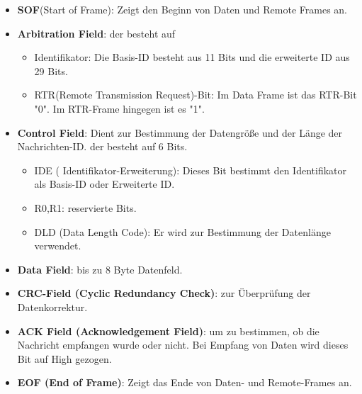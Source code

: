 \begin{itemize}
	\item \textbf{SOF}(Start of Frame):  Zeigt den Beginn von Daten und Remote Frames an.
	\item \textbf{Arbitration Field}: der besteht auf
		\begin{itemize}
			\item Identifikator: Die Basis-ID besteht aus 11 Bits und die erweiterte ID aus 29 Bits.
			\item RTR(Remote Transmission Request)-Bit: Im Data Frame ist das RTR-Bit "0". Im RTR-Frame hingegen ist es "1".
		\end{itemize}
	\item \textbf{Control Field}: Dient zur Bestimmung der Datengröße und der Länge der Nachrichten-ID. der besteht auf 6 Bits.
		\begin{itemize}
			\item IDE ( Identifikator-Erweiterung): Dieses Bit bestimmt den Identifikator als Basis-ID oder Erweiterte ID.
			\item R0,R1: reservierte Bits.
			\item DLD (Data Length Code): Er wird zur Bestimmung der Datenlänge verwendet.
		\end{itemize}
	\item \textbf{Data Field}: bis zu 8 Byte Datenfeld.
	\item \textbf{CRC-Field (Cyclic Redundancy Check)}: zur Überprüfung der Datenkorrektur.
	\item \textbf{ACK Field (Acknowledgement Field)}: um zu bestimmen, ob die Nachricht empfangen wurde oder nicht. Bei Empfang von Daten wird dieses Bit auf High gezogen.
	\item \textbf{EOF (End of Frame)}: Zeigt das Ende von Daten- und Remote-Frames an.
\end{itemize}

